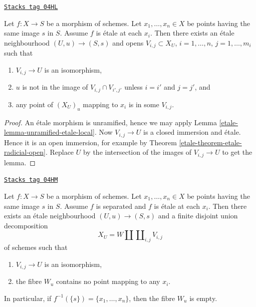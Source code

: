 \begin{lemma}
\label{etale-lemma-etale-etale-local}
\href{https://stacks.math.columbia.edu/tag/04HL}{\texttt{Stacks tag 04HL}}

Let $f : X \to S$ be a morphism of schemes.
Let $x_1, \ldots, x_n \in X$ be points having the same image $s$ in $S$.
Assume $f$ is \'etale at each $x_i$.
Then there exists an \'etale neighbourhood $(U, u) \to (S, s)$
and opens $V_{i, j} \subset X_U$, $i = 1, \ldots, n$, $j = 1, \ldots, m_i$
such that
\begin{enumerate}
\item $V_{i, j} \to U$ is an isomorphism,
\item $u$ is not in the image of $V_{i, j} \cap V_{i', j'}$ unless
$i = i'$ and $j = j'$, and
\item any point of $(X_U)_u$ mapping to $x_i$ is in some $V_{i, j}$.
\end{enumerate}
\end{lemma}

\begin{proof}

An \'etale morphism is unramified, hence we may apply
Lemma \ref{etale-lemma-unramified-etale-local}.
Now $V_{i, j} \to U$ is a closed immersion and \'etale.
Hence it is an open immersion, for example by
Theorem \ref{etale-theorem-etale-radicial-open}.
Replace $U$ by the intersection of the images of $V_{i, j} \to U$
to get the lemma.
\end{proof}

\begin{lemma}
\label{etale-lemma-etale-etale-local-technical}
\href{https://stacks.math.columbia.edu/tag/04HM}{\texttt{Stacks tag 04HM}}

Let $f : X \to S$ be a morphism of schemes.
Let $x_1, \ldots, x_n \in X$ be points having the same image $s$ in $S$.
Assume $f$ is separated and $f$ is \'etale at each $x_i$.
Then there exists an \'etale neighbourhood $(U, u) \to (S, s)$
and a finite disjoint union decomposition
$$
X_U =
W \amalg \coprod\nolimits_{i, j} V_{i, j}
$$
of schemes such that
\begin{enumerate}
\item $V_{i, j} \to U$ is an isomorphism,
\item the fibre $W_u$ contains no point mapping to any $x_i$.
\end{enumerate}
In particular, if $f^{-1}(\{s\}) = \{x_1, \ldots, x_n\}$, then
the fibre $W_u$ is empty.
\end{lemma}

